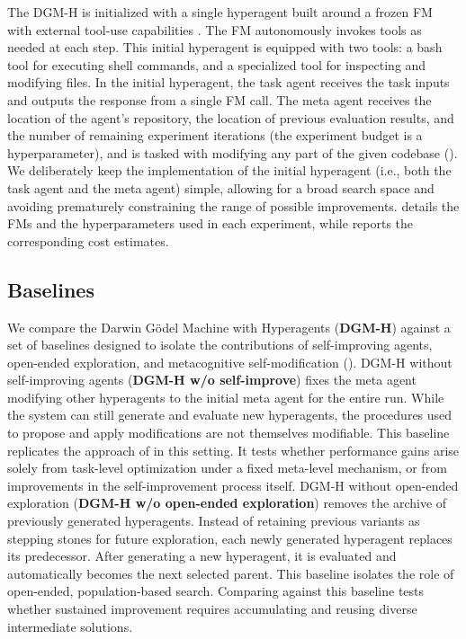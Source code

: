 \documentclass[]{fairmeta}
\begin{document}
The DGM-H is initialized with a single hyperagent built around a frozen FM \citep{brown2020language} with external tool-use capabilities \citep{schick2023toolformer}. The FM autonomously invokes tools as needed at each step. This initial hyperagent is equipped with two tools: a bash tool for executing shell commands, and a specialized tool for inspecting and modifying files. In the initial hyperagent, the task agent receives the task inputs and outputs the response from a single FM call. The meta agent receives the location of the agent's repository, the location of previous evaluation results, and the number of remaining experiment iterations (the experiment budget is a hyperparameter), and is tasked with modifying any part of the given codebase (). We deliberately keep the implementation of the initial hyperagent (i.e., both the task agent and the meta agent) simple, allowing for a broad search space and avoiding prematurely constraining the range of possible improvements.  details the FMs and the hyperparameters used in each experiment, while  reports the corresponding cost estimates.

\subsection{Baselines}
\label{sec:baselines}

We compare the Darwin G\"odel Machine with Hyperagents (\textbf{DGM-H}) against a set of baselines designed to isolate the contributions of self-improving agents, open-ended exploration, and metacognitive self-modification ().
DGM-H without self-improving agents (\textbf{DGM-H w/o self-improve}) fixes the meta agent modifying other hyperagents to the initial meta agent for the entire run. While the system can still generate and evaluate new hyperagents, the procedures used to propose and apply modifications are not themselves modifiable. This baseline replicates the approach of \citep[ADAS,][]{huautomated} in this setting. It tests whether performance gains arise solely from task-level optimization under a fixed meta-level mechanism, or from improvements in the self-improvement process itself.
DGM-H without open-ended exploration (\textbf{DGM-H w/o open-ended exploration}) removes the archive of previously generated hyperagents. Instead of retaining previous variants as stepping stones for future exploration, each newly generated hyperagent replaces its predecessor. After generating a new hyperagent, it is evaluated and automatically becomes the next selected parent. This baseline isolates the role of open-ended, population-based search. Comparing against this baseline tests whether sustained improvement requires accumulating and reusing diverse intermediate solutions.
\end{document}
